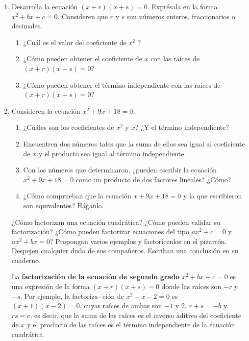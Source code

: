 \documentclass[11pt]{book}
\begin{document}
\begin{enumerate}
  \item Desarrolla la ecuación $(x + r)(x + s) = 0$. Exprésala en la forma $x^2 + bx + c = 0$.
        Consideren que $r$ y $s$ son números enteros, fraccionarios o decimales.
        \begin{enumerate}
          \item ¿Cuál es el valor del coeficiente de $x^2$ ?
          \item ¿Cómo pueden obtener el coeficiente de $x$ con las raíces de $(x + r)(x + s) = 0$?
          \item ¿Cómo pueden obtener el término independiente con las raíces de $(x + r)(x + s) = 0$?
        \end{enumerate}
  \item  Consideren la ecuación $x^2 + 9x + 18 = 0$.
        \begin{enumerate}
          \item ¿Cuáles son los coeficientes de $x^2$ y $x$? ¿Y el término independiente?
          \item Encuentren dos números tales que la suma de ellos sea igual al coeficiente de $x$ y el producto sea igual al término independiente.
          \item Con los números que determinaron, ¿pueden escribir la ecuación $x^2 + 9x + 18 = 0$ como un producto de dos factores lineales? ¿Cómo?
          \item ¿Cómo comprueban que la ecuación $x + 9x + 18 = 0$ y la que escribieron son equivalentes? Háganlo.
        \end{enumerate}

        ¿Cómo factorizan una ecuación cuadrática? ¿Cómo pueden validar su factorización? ¿Cómo pueden
        factorizar ecuaciones del tipo $ax^2 + c = 0$ y $ax^2 + bx = 0$? Propongan varios ejemplos
        y factorícenlos en el pizarrón. Despejen cualquier duda de sus compañeros. Escriban una conclusión en su cuaderno.

        \begin{boxH}
          La \textbf{factorización de la ecuación de segundo grado} $x^2 + bx + c = 0$ es una expresión
          de la forma $(x + r) (x + s) = 0$ donde las raíces son $-r$ y $-s$. Por ejemplo, la factoriza-
          ción de $x^2 - x - 2 = 0$ es $(x + 1) (x - 2) = 0$, cuyas raíces de ambas son $- 1$ y $2$.
          $r + s = -b$ y $r s = c$, es decir, que la suma de las raíces es el inverso aditivo del
          coeficiente de $x$ y el producto de las raíces es el término independiente de la ecuación cuadrática.
        \end{boxH}


\end{enumerate}
\end{document}
